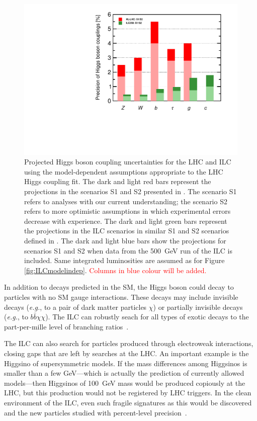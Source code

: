 \documentclass[%
 reprint,
 amsmath,amssymb,
 aps,
]{revtex4-1}
\newcommand{\todo}[1]{\textcolor{red}{{#1}}}
\def\eg{{\it e.g.}}
\begin{document}
\begin{figure}
\begin{center}
\includegraphics[width=0.70\hsize]{figures/ModeldepSummary.pdf}
\caption{Projected Higgs boson coupling uncertainties for the LHC and
  ILC
using the model-dependent assumptions appropriate to the LHC Higgs
coupling fit.   The
dark and light red bars represent the projections in the scenarios S1
and S2 presented in  \cite{Yellow}.  The scenario S1 refers to
analyses with our current understanding; the scenario S2 refers to
more optimistic assumptions in which experimental errors decrease with
experience.  The dark and light green bars represent the
projections in the ILC scenarios in similar S1 and S2 scenarios defined in
\cite{ILCforESS}. 
 The dark and light blue bars show the projections for scenarios S1 and S2
when
data from the 500~GeV run of the ILC is included. Same integrated luminosities are assumed as for Figure \ref{fig:ILCmodelindep}. \todo{Columns in blue colour will be added.}}
 \label{fig:ILCLHC}
\end{center}
\end{figure}

In addition to decays predicted in the SM, the Higgs boson could decay
to particles with no SM gauge interactions.    These decays may
include invisible decays (\eg, to a pair of dark matter particles $\chi$)  or
partially invisible decays (\eg, to $b\bar b \chi \chi$).   The ILC
can robustly seach for all types of exotic decays  to the 
part-per-mille level of branching ratios~\cite{Liu:2016zki}.

The ILC can also search for particles produced through electroweak
interactions, closing gaps that are left by searches at the LHC.  An
important example is the Higgsino of supersymmetric models.   If the
mass  differences among Higgsinos is smaller than a few GeV---which is
actually the prediction of currently allowed models---then Higgsinos
of 100~GeV mass would be produced copiously at the LHC, but this
production would not be registered by LHC triggers.  In the clean
environment 
of the ILC, even such fragile signatures as this 
would be discovered and the new particles 
studied with percent-level precision~\cite{Higgsino}.
\end{document}
